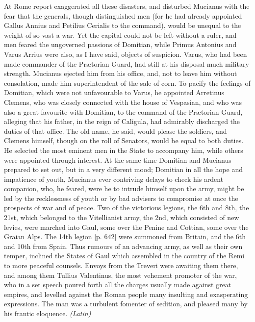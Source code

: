 
At Rome report exaggerated all these disasters, and disturbed Mucianus with the fear that the generals, though distinguished men (for he had already appointed Gallus Annius and Petilius Cerialis to the command), would be unequal to the weight of so vast a war. Yet the capital could not be left without a ruler, and men feared the ungoverned passions of Domitian, while Primus Antonius and Varus Arrius were also, as I have said, objects of suspicion. Varus, who had been made commander of the Prætorian Guard, had still at his disposal much military strength. Mucianus ejected him from his office, and, not to leave him without consolation, made him superintendent of the sale of corn. To pacify the feelings of Domitian, which were not unfavourable to Varus, he appointed Arretinus Clemens, who was closely connected with the house of Vespasian, and who was also a great favourite with Domitian, to the command of the Prætorian Guard, alleging that his father, in the reign of Caligula, had admirably discharged the duties of that office. The old name, he said, would please the soldiers, and Clemens himself, though on the roll of Senators, would be equal to both duties. He selected the most eminent men in the State to accompany him, while others were appointed through interest. At the same time Domitian and Mucianus prepared to set out, but in a very different mood; Domitian in all the hope and impatience of youth, Mucianus ever contriving delays to check his ardent companion, who, he feared, were he to intrude himself upon the army, might be led by the recklessness of youth or by bad advisers to compromise at once the prospects of war and of peace. Two of the victorious legions, the 6th and 8th, the 21st, which belonged to the Vitellianist army, the 2nd, which consisted of new levies, were marched into Gaul, some over the Penine and Cottian, some over the Graian Alps. The 14th legion [p. 642] were summoned from Britain, and the 6th and 10th from Spain. Thus rumours of an advancing army, as well as their own temper, inclined the States of Gaul which assembled in the country of the Remi to more peaceful counsels. Envoys from the Treveri were awaiting them there, and among them Tullius Valentinus, the most vehement promoter of the war, who in a set speech poured forth all the charges usually made against great empires, and levelled against the Roman people many insulting and exasperating expressions. The man was a turbulent fomenter of sedition, and pleased many by his frantic eloquence. \emph{(Latin)}

